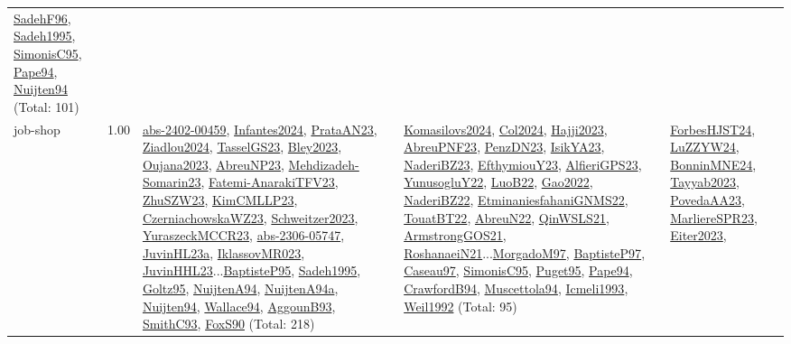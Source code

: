 {\begin{longtable}{p{3cm}r>{\raggedright\arraybackslash}p{6cm}>{\raggedright\arraybackslash}p{6cm}>{\raggedright\arraybackslash}p{8cm}}
\hyperref[detail:SadehF96]{SadehF96}, \hyperref[detail:Sadeh1995]{Sadeh1995}, \hyperref[detail:SimonisC95]{SimonisC95}, \hyperref[detail:Pape94]{Pape94}, \hyperref[detail:Nuijten94]{Nuijten94} (Total: 101)\\
\index{job-shop}\index{Concepts!job-shop}job-shop &  1.00 & \hyperref[detail:abs-2402-00459]{abs-2402-00459}, \hyperref[detail:Infantes2024]{Infantes2024}, \hyperref[detail:PrataAN23]{PrataAN23}, \hyperref[detail:Ziadlou2024]{Ziadlou2024}, \hyperref[detail:TasselGS23]{TasselGS23}, \hyperref[detail:Bley2023]{Bley2023}, \hyperref[detail:Oujana2023]{Oujana2023}, \hyperref[detail:AbreuNP23]{AbreuNP23}, \hyperref[detail:Mehdizadeh-Somarin23]{Mehdizadeh-Somarin23}, \hyperref[detail:Fatemi-AnarakiTFV23]{Fatemi-AnarakiTFV23}, \hyperref[detail:ZhuSZW23]{ZhuSZW23}, \hyperref[detail:KimCMLLP23]{KimCMLLP23}, \hyperref[detail:CzerniachowskaWZ23]{CzerniachowskaWZ23}, \hyperref[detail:Schweitzer2023]{Schweitzer2023}, \hyperref[detail:YuraszeckMCCR23]{YuraszeckMCCR23}, \hyperref[detail:abs-2306-05747]{abs-2306-05747}, \hyperref[detail:JuvinHL23a]{JuvinHL23a}, \hyperref[detail:IklassovMR023]{IklassovMR023}, \hyperref[detail:JuvinHHL23]{JuvinHHL23}...\hyperref[detail:BaptisteP95]{BaptisteP95}, \hyperref[detail:Sadeh1995]{Sadeh1995}, \hyperref[detail:Goltz95]{Goltz95}, \hyperref[detail:NuijtenA94]{NuijtenA94}, \hyperref[detail:NuijtenA94a]{NuijtenA94a}, \hyperref[detail:Nuijten94]{Nuijten94}, \hyperref[detail:Wallace94]{Wallace94}, \hyperref[detail:AggounB93]{AggounB93}, \hyperref[detail:SmithC93]{SmithC93}, \hyperref[detail:FoxS90]{FoxS90} (Total: 218) & \hyperref[detail:Komasilovs2024]{Komasilovs2024}, \hyperref[detail:Col2024]{Col2024}, \hyperref[detail:Hajji2023]{Hajji2023}, \hyperref[detail:AbreuPNF23]{AbreuPNF23}, \hyperref[detail:PenzDN23]{PenzDN23}, \hyperref[detail:IsikYA23]{IsikYA23}, \hyperref[detail:NaderiBZ23]{NaderiBZ23}, \hyperref[detail:EfthymiouY23]{EfthymiouY23}, \hyperref[detail:AlfieriGPS23]{AlfieriGPS23}, \hyperref[detail:YunusogluY22]{YunusogluY22}, \hyperref[detail:LuoB22]{LuoB22}, \hyperref[detail:Gao2022]{Gao2022}, \hyperref[detail:NaderiBZ22]{NaderiBZ22}, \hyperref[detail:EtminaniesfahaniGNMS22]{EtminaniesfahaniGNMS22}, \hyperref[detail:TouatBT22]{TouatBT22}, \hyperref[detail:AbreuN22]{AbreuN22}, \hyperref[detail:QinWSLS21]{QinWSLS21}, \hyperref[detail:ArmstrongGOS21]{ArmstrongGOS21}, \hyperref[detail:RoshanaeiN21]{RoshanaeiN21}...\hyperref[detail:MorgadoM97]{MorgadoM97}, \hyperref[detail:BaptisteP97]{BaptisteP97}, \hyperref[detail:Caseau97]{Caseau97}, \hyperref[detail:SimonisC95]{SimonisC95}, \hyperref[detail:Puget95]{Puget95}, \hyperref[detail:Pape94]{Pape94}, \hyperref[detail:CrawfordB94]{CrawfordB94}, \hyperref[detail:Muscettola94]{Muscettola94}, \hyperref[detail:Icmeli1993]{Icmeli1993}, \hyperref[detail:Weil1992]{Weil1992} (Total: 95) & \hyperref[detail:ForbesHJST24]{ForbesHJST24}, \hyperref[detail:LuZZYW24]{LuZZYW24}, \hyperref[detail:BonninMNE24]{BonninMNE24}, \hyperref[detail:Tayyab2023]{Tayyab2023}, \hyperref[detail:PovedaAA23]{PovedaAA23}, \hyperref[detail:MarliereSPR23]{MarliereSPR23}, \hyperref[detail:Eiter2023]{Eiter2023}, 
\end{longtable}}
